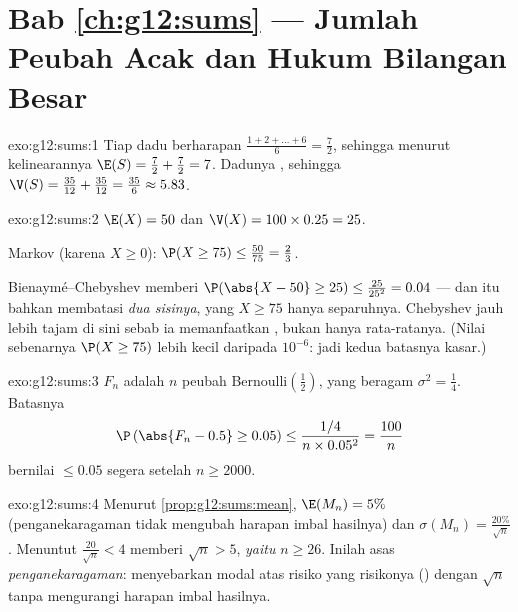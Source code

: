 \section*{Bab \ref{ch:g12:sums} --- Jumlah Peubah Acak dan Hukum Bilangan Besar}

\begin{solution}{exo:g12:sums:1}
Tiap dadu berharapan
$\frac{1 + 2 + \dots + 6}{6} = \frac{7}{2}$, sehingga menurut kelinearannya
$\E(S) = \frac72 + \frac72 = 7$. Dadunya , sehingga
$\V(S) = \frac{35}{12} + \frac{35}{12} = \frac{35}{6} \approx 5.83$.
\end{solution}

\begin{solution}{exo:g12:sums:2}
$\E(X) = 50$ dan $\V(X) = 100 \times 0.25 = 25$.

Markov (karena $X \geq 0$): $\P(X \geq 75) \leq \frac{50}{75} = \frac23$.

Bienaymé--Chebyshev memberi
$\P(\abs{X - 50} \geq 25) \leq \frac{25}{25^2} = 0.04$ --- dan itu bahkan
membatasi  \emph{dua sisinya}, yang $X \geq 75$ hanya separuhnya. Chebyshev
jauh lebih tajam di sini sebab ia memanfaatkan , bukan hanya rata-ratanya.
(Nilai sebenarnya $\P(X \geq 75)$ lebih kecil daripada $10^{-6}$: jadi kedua batasnya
kasar.)
\end{solution}

\begin{solution}{exo:g12:sums:3}
$F_n$ adalah  $n$ peubah Bernoulli$\left(\frac12\right)$,
yang beragam $\sigma^2 = \frac14$. Batasnya
\[
\P\left(\abs{F_n - 0.5} \geq 0.05\right)
\leq \frac{1/4}{n \times 0.05^2} = \frac{100}{n}
\]
bernilai $\leq 0.05$ segera setelah $n \geq 2000$.
\end{solution}

\begin{solution}{exo:g12:sums:4}
Menurut \cref{prop:g12:sums:mean}, $\E(M_n) = 5\%$ (penganekaragaman tidak
mengubah harapan imbal hasilnya) dan
$\sigma(M_n) = \frac{20\%}{\sqrt n}$. Menuntut
$\frac{20}{\sqrt n} < 4$ memberi $\sqrt n > 5$, \emph{yaitu} $n \geq 26$.
Inilah asas \emph{penganekaragaman}: menyebarkan modal atas
risiko yang   risikonya () dengan $\sqrt n$
tanpa mengurangi harapan imbal hasilnya.
\end{solution}

